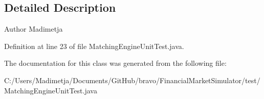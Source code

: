 \subsection{Detailed Description}
\begin{DoxyAuthor}{Author}
Madimetja 
\end{DoxyAuthor}


Definition at line 23 of file Matching\+Engine\+Unit\+Test.\+java.



The documentation for this class was generated from the following file\+:\begin{DoxyCompactItemize}
\item 
C\+:/\+Users/\+Madimetja/\+Documents/\+Git\+Hub/bravo/\+Financial\+Market\+Simulator/test/Matching\+Engine\+Unit\+Test.\+java\end{DoxyCompactItemize}
